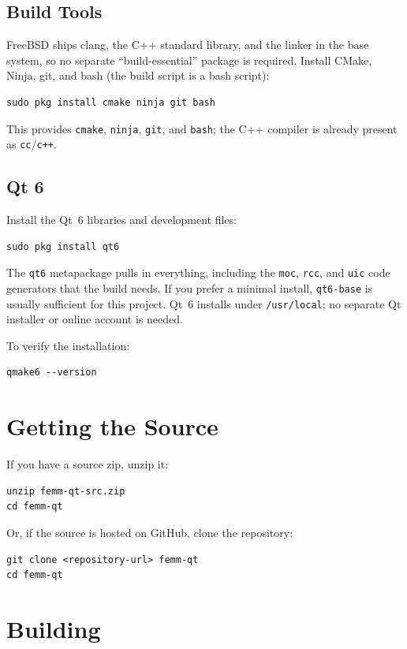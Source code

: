 \documentclass[11pt]{article}
\begin{document}
\subsection{Build Tools}

FreeBSD ships clang, the C++ standard library, and the linker in the base
system, so no separate ``build-essential'' package is required.  Install
CMake, Ninja, git, and bash (the build script is a bash script):
\begin{lstlisting}
sudo pkg install cmake ninja git bash
\end{lstlisting}
This provides \texttt{cmake}, \texttt{ninja}, \texttt{git}, and \texttt{bash};
the C++ compiler is already present as \texttt{cc}/\texttt{c++}.

\subsection{Qt 6}

Install the Qt~6 libraries and development files:
\begin{lstlisting}
sudo pkg install qt6
\end{lstlisting}
The \texttt{qt6} metapackage pulls in everything, including the \texttt{moc},
\texttt{rcc}, and \texttt{uic} code generators that the build needs.  If you
prefer a minimal install, \texttt{qt6-base} is usually sufficient for this
project.  Qt~6 installs under \texttt{/usr/local}; no separate Qt installer or
online account is needed.

To verify the installation:
\begin{lstlisting}
qmake6 --version
\end{lstlisting}

\section{Getting the Source}

If you have a source zip, unzip it:
\begin{lstlisting}
unzip femm-qt-src.zip
cd femm-qt
\end{lstlisting}

Or, if the source is hosted on GitHub, clone the repository:
\begin{lstlisting}
git clone <repository-url> femm-qt
cd femm-qt
\end{lstlisting}

\section{Building}
\end{document}
